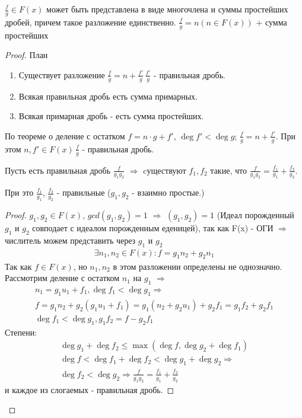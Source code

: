 \begin{theorem}{}
$\frac{f}{g} \in  F(x)$ может быть представлена в виде многочлена и суммы простейших дробей,
причем такое разложение единственно.
$\frac{f}{g} = n (n \in F(x))$ + сумма простейших

\begin{proof}
План
\begin{enumerate}
\item Существует разложение $\frac{f}{g} = n + \frac{f'}{g}\, \frac{f'}{g}$ - правильная дробь.
\item Всякая правильная дробь есть сумма примарных.
\item Всякая примарная дробь - есть сумма простейших.
\end{enumerate}

\begin{Rem}
По теореме о деление с остатком $f = n \cdot g +f'$, $\deg f' < \deg g$;
$\frac{f}{g} = n + \frac{f'}{g}$. При этом $n, f'\in F(x)\, \frac{f}{g}$ - правильная дробь.
\end{Rem}

 
\begin{lemma}
Пусть есть правильная дробь $\frac{f}{g_1 g_2}$ $\Rightarrow$ cуществуют $f_1, f_2$ такие, что
$\frac{f}{g_1 g_2} = \frac{f_1}{g_1} + \frac{f_2}{g_2}$.

При это $\frac{f_1}{g_1}$, $\frac{f_2}{g_2}$ - правильные
($g_1, g_2$ - взаимно простые.) 

\end{lemma}

\begin{proof}
$g_1, g_2 \in F(x)$, $gcd(g_1, g_2) = 1$ $\Rightarrow$ $(g_1, g_2) = 1$ (Идеал порожденный $g_1$ и $g_2$
совподает с идеалом порожденным еденицей), так как F(x) - ОГИ $\Rightarrow$ числитель можем представить через $g_1$ и $g_2$
\begin{gather*}
\exists n_1, n_2 \in F(x) : f = g_1 n_2 + g_2 n_1
\end{gather*}
Так как $f \in F(x)$, но $n_1, n_2$  в этом разложении определены не однозначно.
Рассмотрим деление с остатком $n_1$ на $g_1$ $\Rightarrow$
\begin{gather*}
n_1 = g_1 u_1 + f_1, \deg f_1 < \deg g_1 \Rightarrow \\
f = g_1 n_2 + g_2 (g_1 u_1 + f_1)= g_1 (n_2 + g_2 u_1) + g_2 f_1 = g_1 f_2 + g_2 f_1 \\
\deg f_1 < \deg g_1, g_1 f_2 = f - g_2 f_1
\end{gather*}
Степени:
\begin{gather*}
\deg g_1 + \deg f_2 \le \max (\deg f, \deg g_2 + \deg f_1) \\
\deg f < \deg f_1 + \deg f_2 < \deg g_1 + \deg g_2 \Rightarrow \\
\deg f_2 < \deg g_2 \Rightarrow \frac{f}{g_1 g_2} = \frac{f_1}{g_1} + \frac{f_2}{g_2}
\end{gather*}
и каждое из слогаемых - правильная дробь.
\end{proof}


\end{proof}
\end{theorem}
